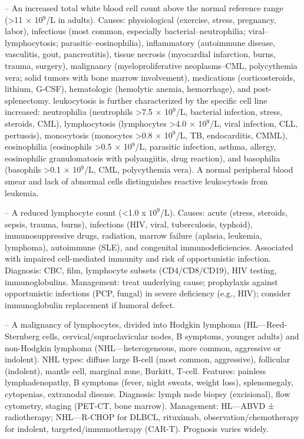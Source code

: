 -- An increased total white blood cell count above the normal reference range (>11 $\times$ 10$^9$/L in adults). Causes: physiological (exercise, stress, pregnancy, labor), infectious (most common, especially bacterial--neutrophilia; viral--lymphocytosis; parasitic--eosinophilia), inflammatory (autoimmune disease, vasculitis, gout, pancreatitis), tissue necrosis (myocardial infarction, burns, trauma, surgery), malignancy (myeloproliferative neoplasms--CML, polycythemia vera; solid tumors with bone marrow involvement), medications (corticosteroids, lithium, G-CSF), hematologic (hemolytic anemia, hemorrhage), and post-splenectomy. leukocytosis is further characterized by the specific cell line increased: neutrophilia (neutrophils >7.5 $\times$ 10$^9$/L, bacterial infection, stress, steroids, CML), lymphocytosis (lymphocytes >4.0 $\times$ 10$^9$/L, viral infection, CLL, pertussis), monocytosis (monocytes >0.8 $\times$ 10$^9$/L, TB, endocarditis, CMML), eosinophilia (eosinophils >0.5 $\times$ 10$^9$/L, parasitic infection, asthma, allergy, eosinophilic granulomatosis with polyangiitis, drug reaction), and basophilia (basophils >0.1 $\times$ 10$^9$/L, CML, polycythemia vera). A normal peripheral blood smear and lack of abnormal cells distinguishes reactive leukocytosis from leukemia.

-- A reduced lymphocyte count (<1.0 x $10^9$/L). Causes: acute (stress, steroids, sepsis, trauma, burns), infections (HIV, viral, tuberculosis, typhoid), immunosuppressive drugs, radiation, marrow failure (aplasia, leukemia, lymphoma), autoimmune (SLE), and congenital immunodeficiencies. Associated with impaired cell-mediated immunity and risk of opportunistic infection. Diagnosis: CBC, film, lymphocyte subsets (CD4/CD8/CD19), HIV testing, immunoglobulins. Management: treat underlying cause; prophylaxis against opportunistic infections (PCP, fungal) in severe deficiency (e.g., HIV); consider immunoglobulin replacement if humoral defect.

-- A malignancy of lymphocytes, divided into Hodgkin lymphoma (HL—Reed-Sternberg cells, cervical/supraclavicular nodes, B symptoms, younger adults) and non-Hodgkin lymphoma (NHL—heterogeneous, more common, aggressive or indolent). NHL types: diffuse large B-cell (most common, aggressive), follicular (indolent), mantle cell, marginal zone, Burkitt, T-cell. Features: painless lymphadenopathy, B symptoms (fever, night sweats, weight loss), splenomegaly, cytopenias, extranodal disease. Diagnosis: lymph node biopsy (excisional), flow cytometry, staging (PET-CT, bone marrow). Management: HL—ABVD ± radiotherapy; NHL—R-CHOP for DLBCL, rituximab, observation/chemotherapy for indolent, targeted/immunotherapy (CAR-T). Prognosis varies widely.

